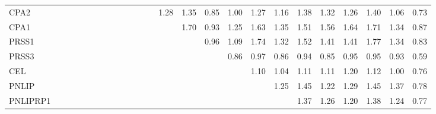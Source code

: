 \begin{longtable}{lrrrrrrrrrrrrrrrrrrrrrrrr}
CPA2     &              &              &              &              &             &             &             &             &            &              &            &            &       1.28 &        1.35 &        0.85 &      1.00 &        1.27 &           1.16 &          1.38 &      1.32 &        1.26 &        1.40 &       1.06 &        0.73 \\
CPA1     &              &              &              &              &             &             &             &             &            &              &            &            &            &        1.70 &        0.93 &      1.25 &        1.63 &           1.35 &          1.51 &      1.56 &        1.64 &        1.71 &       1.34 &        0.87 \\
PRSS1    &              &              &              &              &             &             &             &             &            &              &            &            &            &             &        0.96 &      1.09 &        1.74 &           1.32 &          1.52 &      1.41 &        1.41 &        1.77 &       1.34 &        0.83 \\
PRSS3    &              &              &              &              &             &             &             &             &            &              &            &            &            &             &             &      0.86 &        0.97 &           0.86 &          0.94 &      0.85 &        0.95 &        0.95 &       0.93 &        0.59 \\
CEL      &              &              &              &              &             &             &             &             &            &              &            &            &            &             &             &           &        1.10 &           1.04 &          1.11 &      1.11 &        1.20 &        1.12 &       1.00 &        0.76 \\
PNLIP    &              &              &              &              &             &             &             &             &            &              &            &            &            &             &             &           &             &           1.25 &          1.45 &      1.22 &        1.29 &        1.45 &       1.37 &        0.78 \\
PNLIPRP1 &              &              &              &              &             &             &             &             &            &              &            &            &            &             &             &           &             &                &          1.37 &      1.26 &        1.20 &        1.38 &       1.24 &        0.77 \\

\end{longtable}

